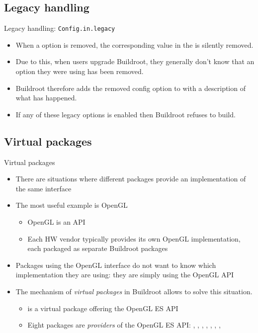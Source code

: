 \subsection{Legacy handling}

\begin{frame}{Legacy handling: {\tt Config.in.legacy}}
  \begin{itemize}
  \item When a  option is removed, the corresponding
    value in the  is silently removed.
  \item Due to this, when users upgrade Buildroot, they generally
    don't know that an option they were using has been removed.
  \item Buildroot therefore adds the removed config option to
     with a description of what has
    happened.
  \item If any of these legacy options is enabled then Buildroot
    refuses to build.
  \end{itemize}
\end{frame}

\subsection{Virtual packages}

\begin{frame}{Virtual packages}
  \begin{itemize}
  \item There are situations where different packages provide an
    implementation of the same interface
  \item The most useful example is OpenGL
    \begin{itemize}
    \item OpenGL is an API
    \item Each HW vendor typically provides its own OpenGL
      implementation, each packaged as separate Buildroot packages
    \end{itemize}
  \item Packages using the OpenGL interface do not want to know which
    implementation they are using: they are simply using the OpenGL
    API
  \item The mechanism of {\em virtual packages} in Buildroot allows to
    solve this situation.
    \begin{itemize}
    \item {} is a virtual package offering the OpenGL ES API
    \item Eight packages are {\em providers} of the OpenGL ES API:
      , , ,
      , ,
      , , 
    \end{itemize}
  \end{itemize}
\end{frame}

